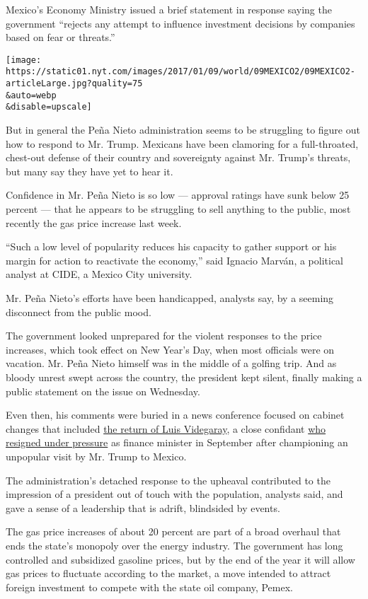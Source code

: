 Mexico's Economy Ministry issued a brief statement in response saying
the government ``rejects any attempt to influence investment decisions
by companies based on fear or threats.''

\texttt{[image: https://static01.nyt.com/images/2017/01/09/world/09MEXICO2/09MEXICO2-articleLarge.jpg?quality=75\\\&auto=webp\\\&disable=upscale]}

But in general the Peña Nieto administration seems to be struggling to
figure out how to respond to Mr. Trump. Mexicans have been clamoring for
a full-throated, chest-out defense of their country and sovereignty
against Mr. Trump's threats, but many say they have yet to hear it.

Confidence in Mr. Peña Nieto is so low --- approval ratings have sunk
below 25 percent --- that he appears to be struggling to sell anything
to the public, most recently the gas price increase last week.

``Such a low level of popularity reduces his capacity to gather support
or his margin for action to reactivate the economy,'' said Ignacio
Marván, a political analyst at CIDE, a Mexico City university.

Mr. Peña Nieto's efforts have been handicapped, analysts say, by a
seeming disconnect from the public mood.

The government looked unprepared for the violent responses to the price
increases, which took effect on New Year's Day, when most officials were
on vacation. Mr. Peña Nieto himself was in the middle of a golfing trip.
And as bloody unrest swept across the country, the president kept
silent, finally making a public statement on the issue on Wednesday.

Even then, his comments were buried in a news conference focused on
cabinet changes that included
\href{http://www.nytimes.com/2017/01/04/world/americas/mexico-united-states-trump-pena-nieto-videgaray.html}{the
return of Luis Videgaray}, a close confidant
\href{http://www.nytimes.com/2016/09/08/world/americas/mexico-finance-minister-luis-videgaray-resigns.html?_r=0}{who
resigned under pressure} as finance minister in September after
championing an unpopular visit by Mr. Trump to Mexico.

The administration's detached response to the upheaval contributed to
the impression of a president out of touch with the population, analysts
said, and gave a sense of a leadership that is adrift, blindsided by
events.

The gas price increases of about 20 percent are part of a broad overhaul
that ends the state's monopoly over the energy industry. The government
has long controlled and subsidized gasoline prices, but by the end of
the year it will allow gas prices to fluctuate according to the market,
a move intended to attract foreign investment to compete with the state
oil company, Pemex.

